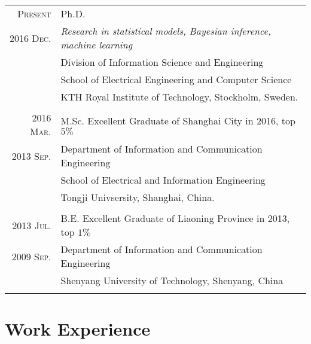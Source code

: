 \documentclass[a4paper,10pt]{article}
\begin{document}
\begin{tabular}{r|p{13cm}}

  \textsc{Present} 	& Ph.D. \\
  \textsc{2016 Dec.} 	& \emph{Research in statistical models, Bayesian inference, machine learning} \\
                    & { Division of Information Science and Engineering
                      } \\
                    & {School of Electrical Engineering and Computer Science} \\
                    & {KTH Royal Institute of Technology, Stockholm, Sweden.} \\
  \multicolumn{2}{c}{} \\


  \textsc{2016 Mar.} 	& M.Sc. {Excellent Graduate of Shanghai City in 2016, top $5\%$}\\
  \textsc{2013 Sep.} 	& {Department of Information and Communication Engineering} \\
                    & {School of Electrical and Information Engineering} \\
                    & {Tongji Univsersity, Shanghai, China.}\\
  \multicolumn{2}{c}{} \\


  \textsc{2013 Jul.} 	& B.E. {Excellent Graduate of Liaoning Province in 2013, top $1\%$}\\
  \textsc{2009 Sep.} 	& {Department of Information and Communication Engineering}\\
                    & {Shenyang University of Technology, Shenyang, China} \\
  \multicolumn{2}{c}{}\\

\end{tabular}


\section{Work Experience}
\end{document}
